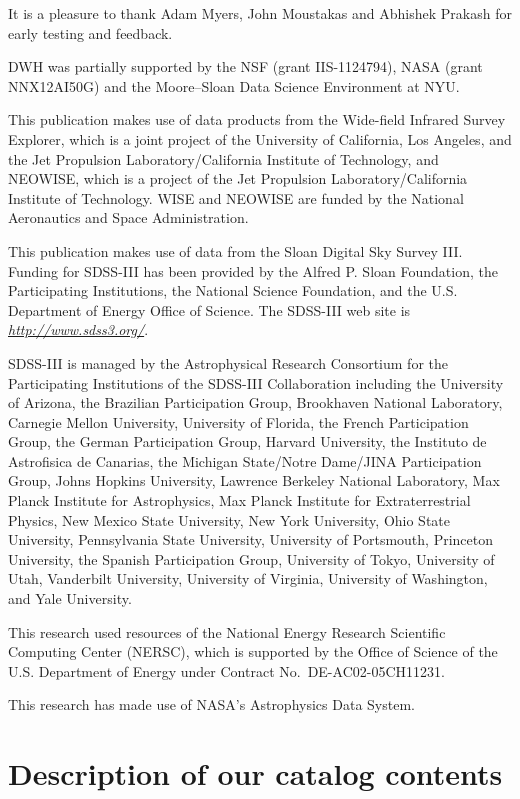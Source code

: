 \documentclass[12pt,preprint]{aastex}
\newcommand{\niceurl}[1]{\href{#1}{\textsl{#1}}}
\begin{document}
\acknowledgements
%
It is a pleasure to thank Adam Myers, John Moustakas and Abhishek
Prakash for early testing and feedback.

DWH was partially supported by the NSF (grant IIS-1124794), NASA
(grant NNX12AI50G) and the Moore--Sloan Data Science Environment at
NYU.

This publication makes use of data products from the Wide-field
Infrared Survey Explorer, which is a joint project of the University
of California, Los Angeles, and the Jet Propulsion
Laboratory/California Institute of Technology, and NEOWISE, which is a
project of the Jet Propulsion Laboratory/California Institute of
Technology. WISE and NEOWISE are funded by the National Aeronautics
and Space Administration.

This publication makes use of data from the Sloan Digital Sky Survey
III.  Funding for SDSS-III has been provided by the Alfred P. Sloan
Foundation, the Participating Institutions, the National Science
Foundation, and the U.S. Department of Energy Office of Science. The
SDSS-III web site is \niceurl{http://www.sdss3.org/}.

SDSS-III is managed by the Astrophysical Research Consortium for the
Participating Institutions of the SDSS-III Collaboration including the
University of Arizona, the Brazilian Participation Group, Brookhaven
National Laboratory, Carnegie Mellon University, University of
Florida, the French Participation Group, the German Participation
Group, Harvard University, the Instituto de Astrofisica de Canarias,
the Michigan State/Notre Dame/JINA Participation Group, Johns Hopkins
University, Lawrence Berkeley National Laboratory, Max Planck
Institute for Astrophysics, Max Planck Institute for Extraterrestrial
Physics, New Mexico State University, New York University, Ohio State
University, Pennsylvania State University, University of Portsmouth,
Princeton University, the Spanish Participation Group, University of
Tokyo, University of Utah, Vanderbilt University, University of
Virginia, University of Washington, and Yale University.

This research used resources of the National Energy Research
Scientific Computing Center (NERSC), which is supported by the Office
of Science of the U.S. Department of Energy under Contract
No.~DE-AC02-05CH11231.

This research has made use of NASA's Astrophysics Data System.


\appendix

\section{Description of our catalog contents}
\label{sec:catalog}
\end{document}

